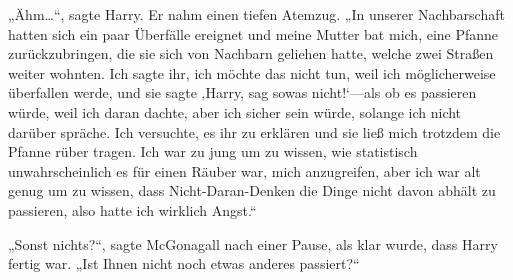 „Ähm…“, sagte Harry. Er nahm einen tiefen Atemzug. „In unserer Nachbarschaft hatten sich ein paar Überfälle ereignet und meine Mutter bat mich, eine Pfanne zurückzubringen, die sie sich von Nachbarn geliehen hatte, welche zwei Straßen weiter wohnten. Ich sagte ihr, ich möchte das nicht tun, weil ich möglicherweise überfallen werde, und sie sagte ‚Harry, sag sowas nicht!‘—als ob es passieren würde, weil ich daran dachte, aber ich sicher sein würde, solange ich nicht darüber spräche. Ich versuchte, es ihr zu erklären und sie ließ mich trotzdem die Pfanne rüber tragen. Ich war zu jung um zu wissen, wie statistisch unwahrscheinlich es für einen Räuber war, mich anzugreifen, aber ich war alt genug um zu wissen, dass Nicht-Daran-Denken die Dinge nicht davon abhält zu passieren, also hatte ich wirklich Angst.“

„Sonst nichts?“, sagte McGonagall nach einer Pause, als klar wurde, dass Harry fertig war. „Ist Ihnen nicht noch etwas anderes passiert?“


